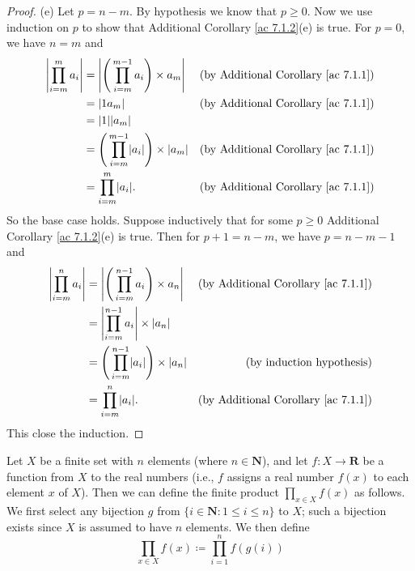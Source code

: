 \begin{proof}{(e)}
    Let \(p = n - m\).
    By hypothesis we know that \(p \geq 0\).
    Now we use induction on \(p\) to show that Additional Corollary \ref{ac 7.1.2}(e) is true.
    For \(p = 0\), we have \(n = m\) and
    \begin{align*}
        \abs*{\prod_{i = m}^m a_i} & = \abs*{\Bigg(\prod_{i = m}^{m - 1} a_i\Bigg) \times a_m}        & \text{(by Additional Corollary \ref{ac 7.1.1})} \\
                                   & = \abs*{1a_m}                                                    & \text{(by Additional Corollary \ref{ac 7.1.1})} \\
                                   & = \abs*{1}\abs*{a_m}                                                                                               \\
                                   & = \Bigg(\prod_{i = m}^{m - 1} \abs*{a_i}\Bigg) \times \abs*{a_m} & \text{(by Additional Corollary \ref{ac 7.1.1})} \\
                                   & = \prod_{i = m}^m \abs*{a_i}.                                    & \text{(by Additional Corollary \ref{ac 7.1.1})}
    \end{align*}
    So the base case holds.
    Suppose inductively that for some \(p \geq 0\) Additional Corollary \ref{ac 7.1.2}(e) is true.
    Then for \(p + 1 = n - m\), we have \(p = n - m - 1\) and
    \begin{align*}
        \abs*{\prod_{i = m}^n a_i} & = \abs*{\Bigg(\prod_{i = m}^{n - 1} a_i\Bigg) \times a_n}        & \text{(by Additional Corollary \ref{ac 7.1.1})} \\
                                   & = \abs*{\prod_{i = m}^{n - 1} a_i} \times \abs*{a_n}                                                               \\
                                   & = \Bigg(\prod_{i = m}^{n - 1} \abs*{a_i}\Bigg) \times \abs*{a_n} & \text{(by induction hypothesis)}                \\
                                   & = \prod_{i = m}^n \abs*{a_i}.                                    & \text{(by Additional Corollary \ref{ac 7.1.1})}
    \end{align*}
    This close the induction.
\end{proof}

\begin{additional corollary}\label{ac 7.1.3}
Let \(X\) be a finite set with \(n\) elements (where \(n \in \mathbf{N}\)), and let \(f : X \to \mathbf{R}\) be a function from \(X\) to the real numbers
(i.e., \(f\) assigns a real number \(f(x)\) to each element \(x\) of \(X\)).
Then we can define the finite product \(\prod_{x \in X} f(x)\) as follows.
We first select any bijection \(g\) from \(\{i \in \mathbf{N} : 1 \leq i \leq n\}\) to \(X\);
such a bijection exists since \(X\) is assumed to have \(n\) elements.
We then define
\[
    \prod_{x \in X} f(x) \coloneqq \prod_{i = 1}^n f(g(i))
\]
\end{additional corollary}

